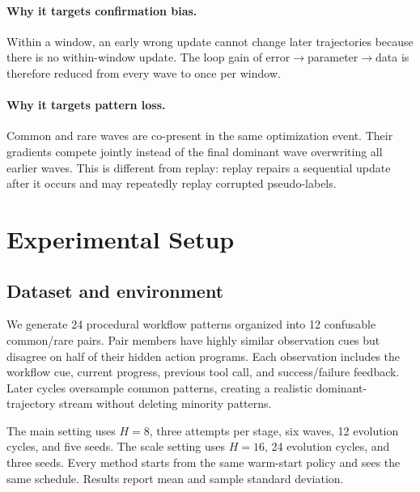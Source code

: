 \documentclass[10pt]{article}
\begin{document}
\paragraph{Why it targets confirmation bias.}
Within a window, an early wrong update cannot change later trajectories because
there is no within-window update.  The loop gain of
error$\rightarrow$parameter$\rightarrow$data is therefore reduced from every
wave to once per window.

\paragraph{Why it targets pattern loss.}
Common and rare waves are co-present in the same optimization event.  Their
gradients compete jointly instead of the final dominant wave overwriting all
earlier waves.  This is different from replay: replay repairs a sequential
update after it occurs and may repeatedly replay corrupted pseudo-labels.

\section{Experimental Setup}
\label{sec:experiments}

\subsection{Dataset and environment}

We generate 24 procedural workflow patterns organized into 12 confusable
common/rare pairs.  Pair members have highly similar observation cues but
disagree on half of their hidden action programs.  Each observation includes
the workflow cue, current progress, previous tool call, and success/failure
feedback.  Later cycles oversample common patterns, creating a realistic
dominant-trajectory stream without deleting minority patterns.

The main setting uses $H=8$, three attempts per stage, six waves, 12 evolution
cycles, and five seeds.  The scale setting uses $H=16$, 24 evolution cycles,
and three seeds.  Every method starts from the same warm-start policy and sees
the same schedule.  Results report mean and sample standard deviation.
\end{document}
